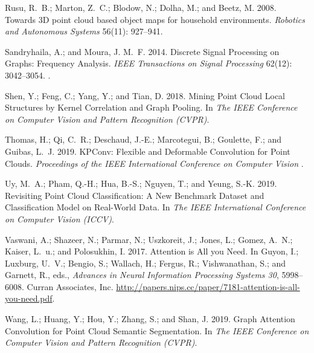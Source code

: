 \documentclass[letterpaper]{article} \usepackage{aaai21}  \usepackage{times}  \usepackage{helvet} \usepackage{courier}  \usepackage[hyphens]{url}  \usepackage{graphicx} \urlstyle{rm} \def\UrlFont{\rm}  \usepackage{natbib}  \usepackage{caption} \frenchspacing  \setlength{\pdfpagewidth}{8.5in}  \setlength{\pdfpageheight}{11in}  \usepackage{color}
\begin{document}
{\begin{thebibliography}{38}
Rusu, R.~B.; Marton, Z.~C.; Blodow, N.; Dolha, M.; and Beetz, M. 2008.
\newblock Towards 3D point cloud based object maps for household environments.
\newblock \emph{Robotics and Autonomous Systems} 56(11): 927--941.

{Sandryhaila}, A.; and {Moura}, J. M.~F. 2014.
\newblock Discrete Signal Processing on Graphs: Frequency Analysis.
\newblock \emph{IEEE Transactions on Signal Processing} 62(12): 3042--3054.
\newblock {}.

Shen, Y.; Feng, C.; Yang, Y.; and Tian, D. 2018.
\newblock Mining Point Cloud Local Structures by Kernel Correlation and Graph
  Pooling.
\newblock In \emph{The IEEE Conference on Computer Vision and Pattern
  Recognition (CVPR)}.

Thomas, H.; Qi, C.~R.; Deschaud, J.-E.; Marcotegui, B.; Goulette, F.; and
  Guibas, L.~J. 2019.
\newblock KPConv: Flexible and Deformable Convolution for Point Clouds.
\newblock \emph{Proceedings of the IEEE International Conference on Computer
  Vision} .

Uy, M.~A.; Pham, Q.-H.; Hua, B.-S.; Nguyen, T.; and Yeung, S.-K. 2019.
\newblock Revisiting Point Cloud Classification: A New Benchmark Dataset and
  Classification Model on Real-World Data.
\newblock In \emph{The IEEE International Conference on Computer Vision
  (ICCV)}.

Vaswani, A.; Shazeer, N.; Parmar, N.; Uszkoreit, J.; Jones, L.; Gomez, A.~N.;
  Kaiser, L.~u.; and Polosukhin, I. 2017.
\newblock Attention is All you Need.
\newblock In Guyon, I.; Luxburg, U.~V.; Bengio, S.; Wallach, H.; Fergus, R.;
  Vishwanathan, S.; and Garnett, R., eds., \emph{Advances in Neural Information
  Processing Systems 30}, 5998--6008. Curran Associates, Inc.
\newblock
  \urlprefix\url{http://papers.nips.cc/paper/7181-attention-is-all-you-need.pdf}.

Wang, L.; Huang, Y.; Hou, Y.; Zhang, S.; and Shan, J. 2019{}.
\newblock Graph Attention Convolution for Point Cloud Semantic Segmentation.
\newblock In \emph{The IEEE Conference on Computer Vision and Pattern
  Recognition (CVPR)}.


\end{thebibliography}}
\end{document}
